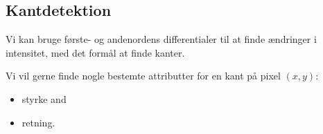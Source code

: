 \subsection{Kantdetektion}

Vi kan bruge første- og andenordens differentialer til at finde ændringer i intensitet, med det formål at finde kanter. 

Vi vil gerne finde nogle bestemte attributter for en kant på pixel $(x,y)$: 

\begin{itemize}
	\item styrke and
	\item retning.
\end{itemize}
